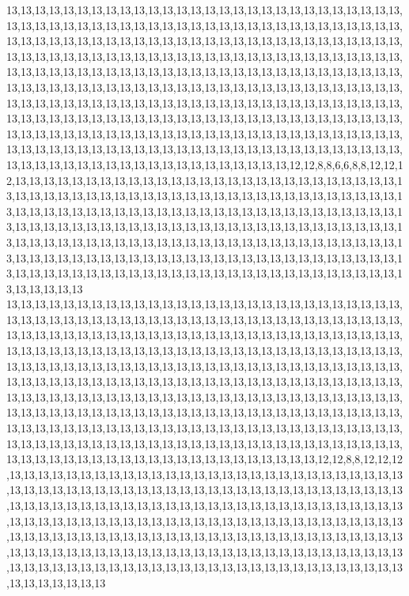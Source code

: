 13,13,13,13,13,13,13,13,13,13,13,13,13,13,13,13,13,13,13,13,13,13,13,13,13,13,13,13,13,13,13,13,13,13,13,13,13,13,13,13,13,13,13,13,13,13,13,13,13,13,13,13,13,13,13,13,13,13,13,13,13,13,13,13,13,13,13,13,13,13,13,13,13,13,13,13,13,13,13,13,13,13,13,13,13,13,13,13,13,13,13,13,13,13,13,13,13,13,13,13,13,13,13,13,13,13,13,13,13,13,13,13,13,13,13,13,13,13,13,13,13,13,13,13,13,13,13,13,13,13,13,13,13,13,13,13,13,13,13,13,13,13,13,13,13,13,13,13,13,13,13,13,13,13,13,13,13,13,13,13,13,13,13,13,13,13,13,13,13,13,13,13,13,13,13,13,13,13,13,13,13,13,13,13,13,13,13,13,13,13,13,13,13,13,13,13,13,13,13,13,13,13,13,13,13,13,13,13,13,13,13,13,13,13,13,13,13,13,13,13,13,13,13,13,13,13,13,13,13,13,13,13,13,13,13,13,13,13,13,13,13,13,13,13,13,13,13,13,13,13,13,13,13,13,13,13,13,13,13,13,13,13,13,13,13,13,13,13,13,13,13,13,13,13,13,13,13,13,13,13,13,13,13,13,13,13,13,13,13,13,13,13,13,13,13,13,13,13,13,13,12,12,8,8,6,6,8,8,12,12,12,13,13,13,13,13,13,13,13,13,13,13,13,13,13,13,13,13,13,13,13,13,13,13,13,13,13,13,13,13,13,13,13,13,13,13,13,13,13,13,13,13,13,13,13,13,13,13,13,13,13,13,13,13,13,13,13,13,13,13,13,13,13,13,13,13,13,13,13,13,13,13,13,13,13,13,13,13,13,13,13,13,13,13,13,13,13,13,13,13,13,13,13,13,13,13,13,13,13,13,13,13,13,13,13,13,13,13,13,13,13,13,13,13,13,13,13,13,13,13,13,13,13,13,13,13,13,13,13,13,13,13,13,13,13,13,13,13,13,13,13,13,13,13,13,13,13,13,13,13,13,13,13,13,13,13,13,13,13,13,13,13,13,13,13,13,13,13,13,13,13,13,13,13,13,13,13,13,13,13,13,13,13,13,13,13,13,13,13,13,13,13,13,13,13,13,13,13,13,13,13,13
13,13,13,13,13,13,13,13,13,13,13,13,13,13,13,13,13,13,13,13,13,13,13,13,13,13,13,13,13,13,13,13,13,13,13,13,13,13,13,13,13,13,13,13,13,13,13,13,13,13,13,13,13,13,13,13,13,13,13,13,13,13,13,13,13,13,13,13,13,13,13,13,13,13,13,13,13,13,13,13,13,13,13,13,13,13,13,13,13,13,13,13,13,13,13,13,13,13,13,13,13,13,13,13,13,13,13,13,13,13,13,13,13,13,13,13,13,13,13,13,13,13,13,13,13,13,13,13,13,13,13,13,13,13,13,13,13,13,13,13,13,13,13,13,13,13,13,13,13,13,13,13,13,13,13,13,13,13,13,13,13,13,13,13,13,13,13,13,13,13,13,13,13,13,13,13,13,13,13,13,13,13,13,13,13,13,13,13,13,13,13,13,13,13,13,13,13,13,13,13,13,13,13,13,13,13,13,13,13,13,13,13,13,13,13,13,13,13,13,13,13,13,13,13,13,13,13,13,13,13,13,13,13,13,13,13,13,13,13,13,13,13,13,13,13,13,13,13,13,13,13,13,13,13,13,13,13,13,13,13,13,13,13,13,13,13,13,13,13,13,13,13,13,13,13,13,13,13,13,13,13,13,13,13,13,13,13,13,13,13,13,13,13,13,13,13,13,13,13,13,13,13,12,12,8,8,12,12,12,13,13,13,13,13,13,13,13,13,13,13,13,13,13,13,13,13,13,13,13,13,13,13,13,13,13,13,13,13,13,13,13,13,13,13,13,13,13,13,13,13,13,13,13,13,13,13,13,13,13,13,13,13,13,13,13,13,13,13,13,13,13,13,13,13,13,13,13,13,13,13,13,13,13,13,13,13,13,13,13,13,13,13,13,13,13,13,13,13,13,13,13,13,13,13,13,13,13,13,13,13,13,13,13,13,13,13,13,13,13,13,13,13,13,13,13,13,13,13,13,13,13,13,13,13,13,13,13,13,13,13,13,13,13,13,13,13,13,13,13,13,13,13,13,13,13,13,13,13,13,13,13,13,13,13,13,13,13,13,13,13,13,13,13,13,13,13,13,13,13,13,13,13,13,13,13,13,13,13,13,13,13,13,13,13,13,13,13,13,13,13,13,13,13,13,13,13,13,13,13,13,13,13
